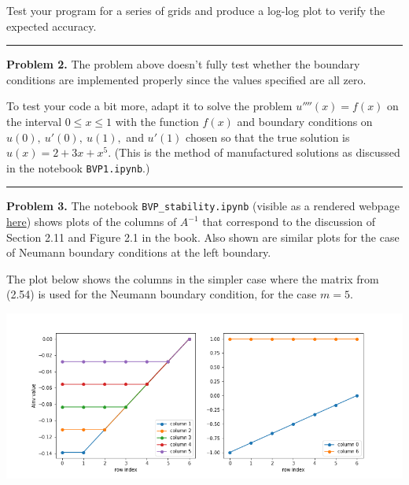 \documentclass[10pt]{article}
\begin{document}
Test your program for a series of grids and produce a
log-log plot to verify the expected accuracy.




\vskip 1cm

\hrule
{\bf Problem 2.}  
The problem above doesn't fully test whether the boundary conditions are
implemented properly since the values specified are all zero.

To test your code a bit more, adapt it to solve the problem $u''''(x) = f(x)$
on the interval $0 \leq x \leq 1$ with the function $f(x)$ and boundary
conditions on $u(0),~u'(0),~u(1),$ and $u'(1)$ chosen so that the true
solution is $u(x) = 2 + 3x + x^5$.  (This is the method of manufactured
solutions as discussed in the notebook {\tt BVP1.ipynb}.)



\vskip 1cm
\newpage

\hrule
{\bf Problem 3.}  The notebook {\tt BVP\_stability.ipynb} (visible as a
rendered webpage
\href{https://rjleveque.github.io/amath585w2020/notebooks/html/BVP\_stability.html}{here})
shows plots of the columns of $A^{-1}$ that correspond to the discussion of
Section 2.11 and Figure 2.1 in the book.  Also shown are similar plots for
the case of Neumann boundary conditions at the left boundary.  

The plot below shows the columns in the simpler case where the matrix 
from (2.54) is used for the Neumann boundary condition, for the case $m=5$. 


\hfil\includegraphics[width=6.0in]{NeumannAinv.png}\hfil
\end{document}
